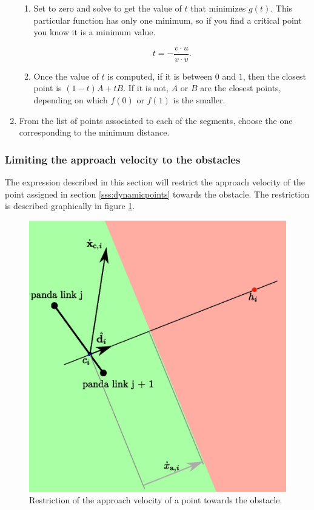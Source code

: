 \begin{enumerate}
\begin{enumerate}
        \item Set to zero and solve to get the value of $t$ that minimizes $g(t)$. This particular function has only one minimum, so if you find a critical point you know it is a minimum value.

        $$
        t = -\frac{v \cdot u}{v \cdot v}.
        $$

        \item Once the value of $t$ is computed, if it is between $0$ and $1$, then the closest point is $(1-t)A + t B$. If it is not, $A$ or $B$ are the closest points, depending on which $f(0)$ or $f(1)$ is the smaller.
    \end{enumerate}

    \item From the list of points associated to each of the segments, choose the one corresponding to the minimum distance.
\end{enumerate}

\subsubsection{Limiting the approach velocity to the obstacles}
\label{sss:firstrestriction}

The expression described in this section will restrict the approach velocity of the point assigned in section \ref{sss:dynamicpoints} towards the obstacle. The restriction is described graphically in figure \ref{fig:firstconstraint}.

\begin{figure}[H]
    \caption[]{
        Restriction of the approach velocity of a point towards the obstacle.
    }
    \begin{center}
    \includegraphics[width=120mm]{figs/firstconstraint.eps}
    \end{center}
    \label{fig:firstconstraint}
\end{figure}


